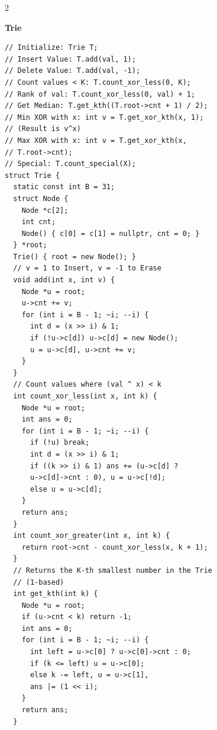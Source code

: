 \documentclass[10pt,a4paper]{article}
\begin{document}
\begin{paracol}{2}
\switchcolumn

\textbf{Trie}
\begin{lstlisting}
// Initialize: Trie T;
// Insert Value: T.add(val, 1);
// Delete Value: T.add(val, -1);
// Count values < K: T.count_xor_less(0, K);
// Rank of val: T.count_xor_less(0, val) + 1;
// Get Median: T.get_kth((T.root->cnt + 1) / 2);
// Min XOR with x: int v = T.get_xor_kth(x, 1);
// (Result is v^x)
// Max XOR with x: int v = T.get_xor_kth(x,
// T.root->cnt);
// Special: T.count_special(X);
struct Trie {
  static const int B = 31;
  struct Node {
    Node *c[2];
    int cnt;
    Node() { c[0] = c[1] = nullptr, cnt = 0; }
  } *root;
  Trie() { root = new Node(); }
  // v = 1 to Insert, v = -1 to Erase
  void add(int x, int v) {
    Node *u = root;
    u->cnt += v;
    for (int i = B - 1; ~i; --i) {
      int d = (x >> i) & 1;
      if (!u->c[d]) u->c[d] = new Node();
      u = u->c[d], u->cnt += v;
    }
  }
  // Count values where (val ^ x) < k
  int count_xor_less(int x, int k) {
    Node *u = root;
    int ans = 0;
    for (int i = B - 1; ~i; --i) {
      if (!u) break;
      int d = (x >> i) & 1;
      if ((k >> i) & 1) ans += (u->c[d] ?
      u->c[d]->cnt : 0), u = u->c[!d];
      else u = u->c[d];
    }
    return ans;
  }
  int count_xor_greater(int x, int k) {
    return root->cnt - count_xor_less(x, k + 1);
  }
  // Returns the K-th smallest number in the Trie
  // (1-based)
  int get_kth(int k) {
    Node *u = root;
    if (u->cnt < k) return -1;
    int ans = 0;
    for (int i = B - 1; ~i; --i) {
      int left = u->c[0] ? u->c[0]->cnt : 0;
      if (k <= left) u = u->c[0];
      else k -= left, u = u->c[1],
      ans |= (1 << i);
    }
    return ans;
  }
\end{lstlisting}

\switchcolumn


\end{paracol}
\end{document}
